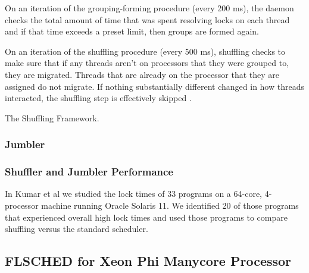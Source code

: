 \documentclass{sig-alternate}
\begin{document}
On an iteration of the grouping-forming procedure (every 200 ms), the daemon checks the total amount of time that was spent resolving locks on each thread and if that time exceeds a preset limit, then groups are formed again.

On an iteration of the shuffling procedure (every 500 ms), shuffling checks to make sure that if any threads aren't on processors that they were grouped to, they are migrated. Threads that are already on the processor that they are assigned do not migrate. If nothing substantially different changed in how threads interacted, the shuffling step is effectively skipped \cite{KumarEtal:2014}.

\begin{algorithm}


	\caption{The Shuffling Framework.}\label{euclid}\label{alg:shuffler}
\end{algorithm}

\subsubsection{Jumbler}
\label{sec:jumbler}



\subsubsection{Shuffler and Jumbler Performance}
\label{sec:sj_performance}

In Kumar et al we studied the lock times of 33 programs on a 64-core, 4-processor machine running Oracle Solaris 11. We identified 20 of those programs that experienced overall high lock times and used those programs to compare shuffling versus the standard scheduler.



\subsection{FLSCHED for Xeon Phi Manycore Processor}
\label{sec:flsched}
\end{document}
